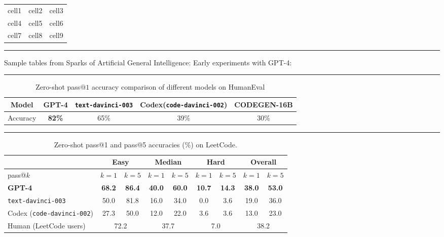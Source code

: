 \documentclass{article}
\newcommand{\DV}{GPT-4\xspace}
\begin{document}
\begin{center}
\begin{tabular}{ |c|c|c| } 
 \hline
 cell1 & cell2 & cell3 \\ 
 cell4 & cell5 & cell6 \\ 
 cell7 & cell8 & cell9 \\ 
 \hline
\end{tabular}
\end{center}

{\color{red} \rule{\linewidth}{0.5mm}}


Sample tables from Sparks of Artificial General Intelligence: Early experiments with GPT-4:

{\color{red} \rule{\linewidth}{0.5mm}}
\vspace{-4mm}
\begin{table}[H]
\begin{center}
 \begin{tabular}{c|cccc}
\toprule
Model& \textbf{\DV} & \texttt{text-davinci-003} & Codex(\texttt{code-davinci-002}) & CODEGEN-16B \\
\midrule
\midrule
Accuracy& \textbf{82\%} & 65\% & 39\% & 30\% \\
\bottomrule
\end{tabular}
\end{center}
\vspace{-.6cm}
\caption{Zero-shot pass$@1$ accuracy comparison of different models on HumanEval}
\vspace{-3mm}
\end{table}

{\color{red} \rule{\linewidth}{0.5mm}}



\vspace{-3mm}
\begin{table}[H]
\begin{center}
\begin{tabular}{l|c|c|c|c|c|c||c|c}
\toprule
  & \multicolumn{2}{c|}{Easy} &  \multicolumn{2}{c|}{Median} &  \multicolumn{2}{c||}{Hard} & \multicolumn{2}{c}{Overall}\\
\hline
pass@$k$  & $k=1$ & $k=5$ & $k=1$ & $k=5$ & $k=1$ & $k=5$ & $k=1$ & $k=5$\\
\hline
\textbf{\DV}              & \textbf{68.2} & \textbf{86.4} & \textbf{40.0} & \textbf{60.0} & \textbf{10.7} & \textbf{14.3} & \textbf{38.0} & \textbf{53.0}\\
\texttt{text-davinci-003} & 50.0 & 81.8 & 16.0 & 34.0 &  0.0 &  3.6 & 19.0 & 36.0\\
Codex (\texttt{code-davinci-002}) & 27.3 & 50.0 &  12.0 & 22.0 &  3.6 &  3.6 &  13.0 & 23.0\\
\hline
Human (LeetCode users) & \multicolumn{2}{c|}{72.2} & \multicolumn{2}{c|}{37.7} & \multicolumn{2}{c||}{7.0} & \multicolumn{2}{c}{38.2} \\
\bottomrule
\end{tabular}
\end{center}
\vspace{-6mm}
\caption{Zero-shot pass@1 and pass@5 accuracies (\%) on LeetCode.}
\label{tab:leetcode-results}
\end{table}
\end{document}
